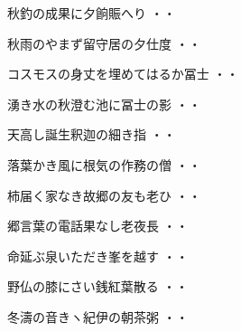 \vspace{0.6cm}
\begin{shiika}秋釣の成果に夕餉賑へり
\hfill{・・}\end{shiika}
\vspace{0.6cm}
\begin{shiika}秋雨のやまず留守居の夕仕度
\hfill{・・}\end{shiika}
\vspace{0.6cm}
\begin{shiika}コスモスの身丈を埋めてはるか冨士
\hfill{・・}\end{shiika}
\vspace{0.6cm}
\begin{shiika}湧き水の秋澄む池に冨士の影
\hfill{・・}\end{shiika}
\vspace{0.6cm}
\begin{shiika}天高し誕生釈迦の細き指
\hfill{・・}\end{shiika}
\vspace{0.6cm}
\begin{shiika}落葉かき風に根気の作務の僧
\hfill{・・}\end{shiika}
\vspace{0.6cm}
\begin{shiika}柿届く家なき故郷の友も老ひ
\hfill{・・}\end{shiika}
\vspace{0.6cm}
\begin{shiika}郷言葉の電話果なし老夜長
\hfill{・・}\end{shiika}
\vspace{0.6cm}
\begin{shiika}命延ぶ泉いただき峯を越す
\hfill{・・}\end{shiika}
\vspace{0.6cm}
\begin{shiika}野仏の膝にさい銭紅葉散る
\hfill{・・}\end{shiika}
\vspace{0.6cm}
\begin{shiika}冬濤の音きヽ紀伊の朝茶粥
\hfill{・・}\end{shiika}
\vspace{0.6cm}
